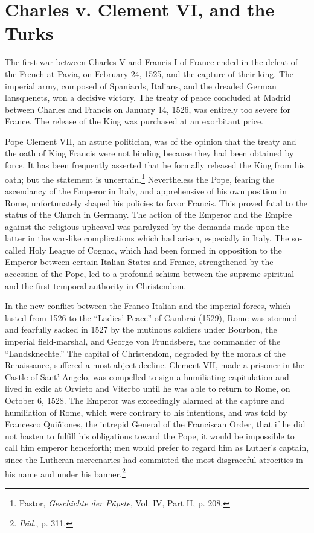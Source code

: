 \section{Charles v. Clement VI, and the Turks}

The first war between Charles V and Francis I of France ended in
the defeat of the French at Pavia, on February 24, 1525, and the capture
of their king. The imperial army, composed of Spaniards, Italians,
and the dreaded German lansquenets, won a decisive victory. The
treaty of peace concluded at Madrid between Charles and Francis on
January 14, 1526, was entirely too severe for France. The release of
the King was purchased at an exorbitant price.

Pope Clement VII, an astute politician, was of the opinion that the
treaty and the oath of King Francis were not binding because they
had been obtained by force. It has been frequently asserted that he
formally released the King from his oath; but the statement is uncertain.\footnote
{Pastor, \textit{Geschichte der Päpste}, Vol. IV, Part II, p. 208.}
Nevertheless the Pope, fearing the ascendancy of the Emperor
in Italy, and apprehensive of his own position in Rome, unfortunately
shaped his policies to favor Francis. This proved fatal to the
status of the Church in Germany. The action of the Emperor and the
Empire against the religious upheaval was paralyzed by the demands
made upon the latter in the war-like complications which had arisen,
especially in Italy. The so-called Holy League of Cognac, which had
been formed in opposition to the Emperor between certain Italian
States and France, strengthened by the accession of the Pope, led to
a profound schism between the supreme spiritual and the first temporal
authority in Christendom.

In the new conflict between the Franco-Italian and the imperial
forces, which lasted from 1526 to the “Ladies’ Peace” of Cambrai
(1529), Rome was stormed and fearfully sacked in 1527 by the mutinous
soldiers under Bourbon, the imperial field-marshal, and George
von Frundsberg, the commander of the ``Landsknechte.'' The capital
of Christendom, degraded by the morals of the Renaissance, suffered
a most abject decline. Clement VII, made a prisoner in the Castle of
Sant’ Angelo, was compelled to sign a humiliating capitulation and
lived in exile at Orvieto and Viterbo until he was able to return to
Rome, on October 6, 1528. The Emperor was exceedingly alarmed
at the capture and humiliation of Rome, which were contrary to his
intentions, and was told by Francesco Quiñiones, the intrepid General
of the Franciscan Order, that if he did not hasten to fulfill his obligations
toward the Pope, it would be impossible to call him emperor
henceforth; men would prefer to regard him as Luther’s captain,
since the Lutheran mercenaries had committed the most disgraceful
atrocities in his name and under his banner.\footnote{\textit{Ibid.}, p. 311.}

